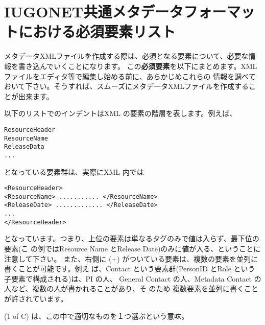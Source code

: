 \section{IUGONET共通メタデータフォーマットにおける必須要素リスト}
メタデータXMLファイルを作成する際は、必須となる要素について、必要な情報を書き込んでいくことになります。
この{\bf 必須要素}を以下にまとめます。XMLファイルをエディタ等で編集し始める前に、あらかじめこれらの
情報を調べておいて下さい。そうすれば、スムーズにメタデータXMLファイルを作成することが出来ます。
\par

以下のリストでのインデントはXML の要素の階層を表します。例えば、
\begin{screen}
\begin{verbatim}
ResourceHeader
ResourceName
ReleaseData
...
\end{verbatim}
\end{screen}
となっている要素群は、実際にXML 内では
\begin{screen}
\begin{verbatim}
<ResourceHeader>
<ResourceName> ........... </ResourceName>
<ReleaseDate> ............. </ReleaseDate>
...
</ResourceHeader>
\end{verbatim}
\end{screen}
となっています。つまり、上位の要素は単なるタグのみで値は入らず、最下位の要素(こ
の例ではResource Name とRelease Date)のみに値が入る、ということに注意して下さい。
また、右側に (+) がついている要素は、複数の要素を並列に書くことが可能です。例え
ば、Contact という要素群(PersonID とRole という子要素で構成される)は、PI の人、
General Contact の人、Metadata Contact の人など、複数の人が書かれることがあり、そ
のため 複数要素を並列に書くことが許されています。

(1 of C) は、この中で適切なものを１つ選ぶという意味。

